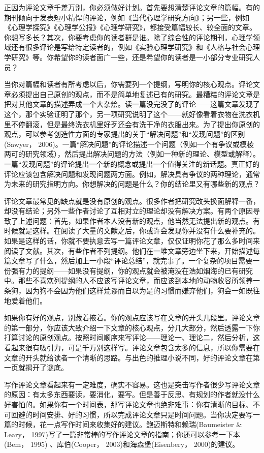 正因为评论文章千差万别，你必须做好计划。首先要想清楚评论文章的篇幅。有的期刊倾向于发表短小精悍的评论，例如《当代心理学研究方向》；另一些，例如《心理学探究》《心理学公报》《心理学研究》，都接受篇幅较长、较全面的文章。你想写多长？其次，你要考虑你的读者群是谁。除了综合性的评论期刊，心理学领域还有很多评论是写给特定读者的，例如《实验心理学研究》和《人格与社会心理学研究》等。你希望你的读者面广一些，还是希望你的读者是一小部分专业研究人员？

当你对篇幅和读者有所考虑以后，你需要列一个提纲，写明你的核心观点。评论文章必须提出自己原创的观点，而不是简单地复述已有的研究。最糟糕的评论文章是把对其他文章的描述弄成一个大杂烩。读一篇没完没了的评论——这篇文章发现了这个，那个实验证明了那个，另一项研究说明了这个——就好像看着衣物在洗衣机里不停翻滚，但是最终洗衣机里好歹还会有洗干净的衣服出来。为了提出你原创的观点，可以参考创造性方面的专家提出的关于“解决问题”和“发现问题”的区别(Sawyer， 2006)。一篇“解决问题”的评论描述一个问题（例如一个有争议或模棱两可的研究领域），然后提出解决问题的方法（例如一种新的理论、模型或解释）。一篇“发现问题”的评论提出一个新的概念或提出一个值得关注的新话题。真正好的评论应该包含解决问题和发现问题两方面。例如，解决具有争议的两种理论，通常为未来的研究指明方向。你想解决的问题是什么？你的结论里又有哪些新的观点？

评论文章最常见的缺点就是没有原创的观点。很多作者把研究改头换面解释一番，却没有结论；另外一些作者讨论了互相对立的理论却没有解决方案。有两个原因导致了上述问题：首先，如果作者本人没有新的观点，他当然无法提出新的观点。有时候就是这样。在阅读了大量的文献之后，你或许会发现你并没有什么要补充的。如果是这样的话，你就不要执意去写一篇评论文章，仅仅证明你花了那么多时间来阅读了文献。其次，有些作者不列提纲。他们在一堆文章旁边坐下来，开始描述每篇文章写了什么，然后加上一小段“评论总结”，就完事了。一个复杂的项目需要一份强有力的提纲——如果没有提纲，你的观点就会被淹没在浩如烟海的已有研究中。那些不喜欢列提纲的人不应该写评论文章，而应该到本地的动物收容所领养一条狗，因为狗不会因为他们这样荒谬而自以为是的习惯而嫌弃他们，狗会一如既往地爱着他们。

如果你有好的观点，别藏着掖着。你的观点应该写在文章的开头几段里。评论文章的第一部分，你应该大致介绍一下文章的核心观点，分几大部分，然后透露一下你打算讨论的原创观点。按照时间顺序来写评论——理论一、理论二，然后分析，这看起来很有吸引力，可是千万别这样写。评论文章包含太多的信息，所以你需要在文章的开头就给读者一个清晰的思路。与出色的推理小说不同，好的评论文章在第一页就揭开了谜底。

写作评论文章看起来有一定难度，确实不容易。这也是突击写作者很少写评论文章的原因：有太多东西要读，要消化，要写。但是善于反思、有规划的作者就没什么好害怕的。如果你有一个时间表，那写评论文章也绝非难事：你有清晰的目标、不可回避的时间安排、好的习惯，所以完成评论文章只是时间问题。当你决定要写一篇的时候，花一点写作时间来收集好的建议。鲍迈斯特和赖瑞(Baumeister \& Leary， 1997)写了一篇非常棒的写作评论文章的指南；你还可以参考一下本(Bem， 1995) 、库伯(Cooper， 2003)和海森堡(Eisenbery， 2000)的建议。

